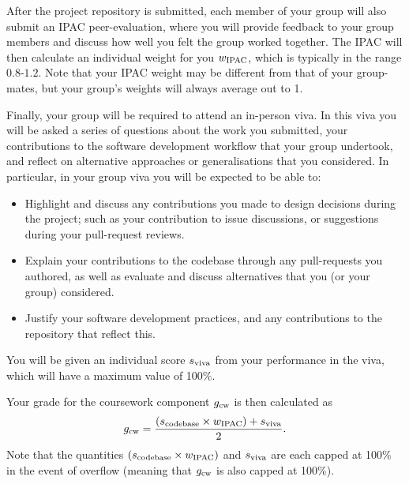 After the project repository is submitted, each member of your group will also submit an IPAC peer-evaluation, where you will provide feedback to your group members and discuss how well you felt the group worked together.
The IPAC will then calculate an individual weight for you $w_{\mathrm{IPAC}}$, which is typically in the range $0.8$-$1.2$.
Note that your IPAC weight may be different from that of your group-mates, but your group's weights will always average out to 1.

Finally, your group will be required to attend an in-person viva.
In this viva you will be asked a series of questions about the work you submitted, your contributions to the software development workflow that your group undertook, and reflect on alternative approaches or generalisations that you considered.
In particular, in your group viva you will be expected to be able to:

\begin{itemize}
  \item Highlight and discuss any contributions you made to design decisions during the project; such as your contribution to issue discussions, or suggestions during your pull-request reviews.
  \item Explain your contributions to the codebase through any pull-requests you authored, as well as evaluate and discuss alternatives that you (or your group) considered.
  \item Justify your software development practices, and any contributions to the repository that reflect this.
\end{itemize}

You will be given an individual score $s_{\mathrm{viva}}$ from your performance in the viva, which will have a maximum value of 100\%.

Your grade for the coursework component $g_{\mathrm{cw}}$ is then calculated as
\begin{align} \label{eq:coursework-grade-calculation}
  g_{\mathrm{cw}} = \frac{(s_{\mathrm{codebase}} \times w_{\mathrm{IPAC}}) + s_{\mathrm{viva}}}{2}.
\end{align}
Note that the quantities $(s_{\mathrm{codebase}} \times w_{\mathrm{IPAC}})$ and $s_{\mathrm{viva}}$ are each capped at 100\% in the event of overflow (meaning that $g_{\mathrm{cw}}$ is also capped at 100\%).



